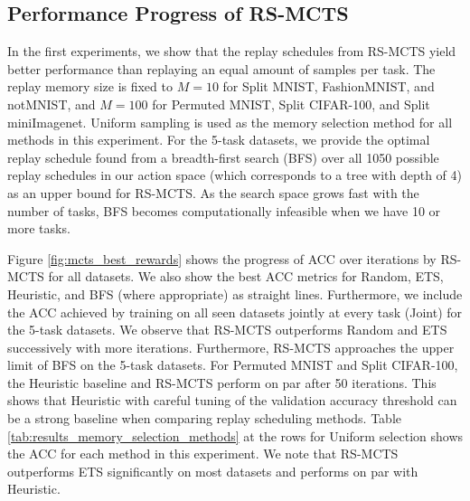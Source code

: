
%


\subsection{Performance Progress of RS-MCTS}\label{paperC:sec:results_with_mcts}

In the first experiments, we show that the replay schedules from RS-MCTS yield better performance than replaying an equal amount of samples per task. 
The replay memory size is fixed to $M=10$ for Split MNIST, FashionMNIST, and notMNIST, and $M=100$ for Permuted MNIST, Split CIFAR-100, and Split miniImagenet. Uniform sampling is used as the memory selection method for all methods in this experiment.
For the 5-task datasets, we provide the optimal replay schedule found from a breadth-first search (BFS) over all 1050 possible replay schedules in our action space (which corresponds to a tree with depth of 4) as an upper bound for RS-MCTS. As the search space grows fast with the number of tasks, BFS becomes computationally infeasible when we have 10 or more tasks.


Figure \ref{fig:mcts_best_rewards} shows the progress of ACC over %
iterations by RS-MCTS for all datasets. We also show the best ACC metrics for Random, ETS, Heuristic, and BFS (where appropriate) as straight lines. 
Furthermore, we include the ACC achieved by training on all seen datasets jointly at every task (Joint) for the 5-task datasets.
We observe that RS-MCTS outperforms Random and ETS successively with more iterations. Furthermore, RS-MCTS approaches the upper limit of BFS on the 5-task datasets. For Permuted MNIST and Split CIFAR-100, the Heuristic baseline and RS-MCTS perform on par after 50 iterations. This shows that Heuristic with careful tuning of the validation accuracy threshold can be a strong baseline when comparing replay scheduling methods. Table \ref{tab:results_memory_selection_methods} at the rows for Uniform selection shows the ACC for each method in this experiment. We note that RS-MCTS outperforms ETS significantly on most datasets and performs on par with Heuristic. 




